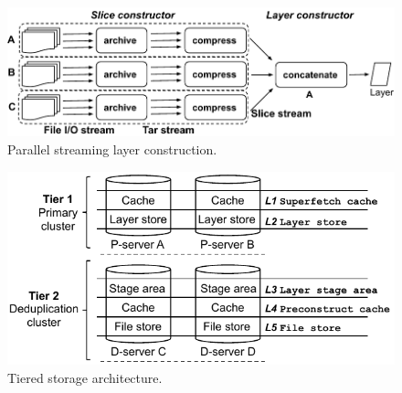 

\begin{figure}[t]
	\centering
	\centering
	\includegraphics[width=\columnwidth]{graphs/sift-layer-construct-new.pdf}
	\caption{Parallel streaming layer construction.}
	\label{fig:construct}
\end{figure}

\begin{figure}[t]
	\centering
	\centering
	\includegraphics[width=\columnwidth]{graphs/sift-cache-bigger.pdf}
	\caption{Tiered storage architecture.}
	\label{fig:tieredstore}
\end{figure} 